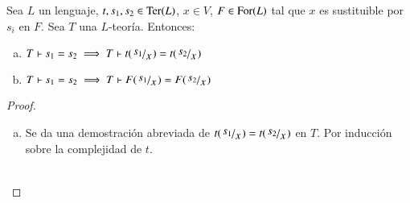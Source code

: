 \begin{thm}\label{thm:igualdad}
    Sea $L$ un lenguaje, $t, s_1, s_2 \in \mathrm{Ter}(L)$, $x \in V$, $F \in \mathrm{For}(L)$ tal que $x$ es sustituible por $s_i$ en $F$. Sea $T$ una $L$-teoría. Entonces:
    \begin{enumerate}[(a)]
        \item $T \vdash s_1 = s_2 \implies T \vdash t(\quo{s_1}{x}) = t(\quo{s_2}{x})$
        \item $T \vdash s_1 = s_2 \implies T \vdash F(\quo{s_1}{x}) = F(\quo{s_2}{x})$
    \end{enumerate}
\end{thm}

\begin{proof}$ $
    \begin{enumerate}[(a)]
        \item Se da una demostración abreviada de $t(\quo{s_1}{x}) = t(\quo{s_2}{x})$ en $T$. Por inducción sobre la complejidad de $t$.\\\\


\end{enumerate}
\end{proof}
